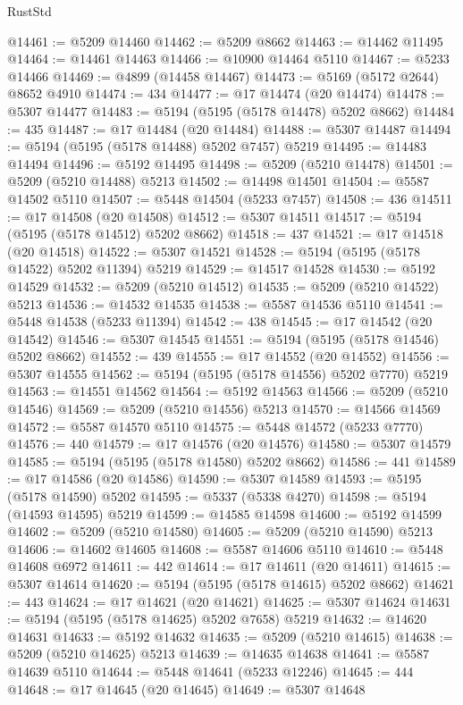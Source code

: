 \begin{lexlean}{RustStd}
\begin{coremodule}
@14461 := @5209 @14460
@14462 := @5209 @8662
@14463 := @14462 @11495
@14464 := @14461 @14463
@14466 := @10900 @14464 @5110
@14467 := @5233 @14466
@14469 := @4899 (@14458 @14467)
@14473 := @5169 (@5172 @2644) @8652 @4910
@14474 := 434
@14477 := @17 @14474 (@20 @14474)
@14478 := @5307 @14477
@14483 := @5194 (@5195 (@5178 @14478) @5202 @8662)
@14484 := 435
@14487 := @17 @14484 (@20 @14484)
@14488 := @5307 @14487
@14494 := @5194 (@5195 (@5178 @14488) @5202 @7457) @5219
@14495 := @14483 @14494
@14496 := @5192 @14495
@14498 := @5209 (@5210 @14478)
@14501 := @5209 (@5210 @14488) @5213
@14502 := @14498 @14501
@14504 := @5587 @14502 @5110
@14507 := @5448 @14504 (@5233 @7457)
@14508 := 436
@14511 := @17 @14508 (@20 @14508)
@14512 := @5307 @14511
@14517 := @5194 (@5195 (@5178 @14512) @5202 @8662)
@14518 := 437
@14521 := @17 @14518 (@20 @14518)
@14522 := @5307 @14521
@14528 := @5194 (@5195 (@5178 @14522) @5202 @11394) @5219
@14529 := @14517 @14528
@14530 := @5192 @14529
@14532 := @5209 (@5210 @14512)
@14535 := @5209 (@5210 @14522) @5213
@14536 := @14532 @14535
@14538 := @5587 @14536 @5110
@14541 := @5448 @14538 (@5233 @11394)
@14542 := 438
@14545 := @17 @14542 (@20 @14542)
@14546 := @5307 @14545
@14551 := @5194 (@5195 (@5178 @14546) @5202 @8662)
@14552 := 439
@14555 := @17 @14552 (@20 @14552)
@14556 := @5307 @14555
@14562 := @5194 (@5195 (@5178 @14556) @5202 @7770) @5219
@14563 := @14551 @14562
@14564 := @5192 @14563
@14566 := @5209 (@5210 @14546)
@14569 := @5209 (@5210 @14556) @5213
@14570 := @14566 @14569
@14572 := @5587 @14570 @5110
@14575 := @5448 @14572 (@5233 @7770)
@14576 := 440
@14579 := @17 @14576 (@20 @14576)
@14580 := @5307 @14579
@14585 := @5194 (@5195 (@5178 @14580) @5202 @8662)
@14586 := 441
@14589 := @17 @14586 (@20 @14586)
@14590 := @5307 @14589
@14593 := @5195 (@5178 @14590) @5202
@14595 := @5337 (@5338 @4270)
@14598 := @5194 (@14593 @14595) @5219
@14599 := @14585 @14598
@14600 := @5192 @14599
@14602 := @5209 (@5210 @14580)
@14605 := @5209 (@5210 @14590) @5213
@14606 := @14602 @14605
@14608 := @5587 @14606 @5110
@14610 := @5448 @14608 @6972
@14611 := 442
@14614 := @17 @14611 (@20 @14611)
@14615 := @5307 @14614
@14620 := @5194 (@5195 (@5178 @14615) @5202 @8662)
@14621 := 443
@14624 := @17 @14621 (@20 @14621)
@14625 := @5307 @14624
@14631 := @5194 (@5195 (@5178 @14625) @5202 @7658) @5219
@14632 := @14620 @14631
@14633 := @5192 @14632
@14635 := @5209 (@5210 @14615)
@14638 := @5209 (@5210 @14625) @5213
@14639 := @14635 @14638
@14641 := @5587 @14639 @5110
@14644 := @5448 @14641 (@5233 @12246)
@14645 := 444
@14648 := @17 @14645 (@20 @14645)
@14649 := @5307 @14648

\end{coremodule}
\end{lexlean}
